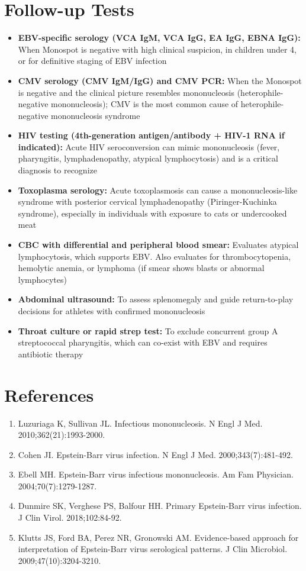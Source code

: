 \section*{Follow-up Tests}
\begin{itemize}
  \item \textbf{EBV-specific serology (VCA IgM, VCA IgG, EA IgG, EBNA IgG):} When Monospot is negative with high clinical suspicion, in children under 4, or for definitive staging of EBV infection
  \item \textbf{CMV serology (CMV IgM/IgG) and CMV PCR:} When the Monospot is negative and the clinical picture resembles mononucleosis (heterophile-negative mononucleosis); CMV is the most common cause of heterophile-negative mononucleosis syndrome
  \item \textbf{HIV testing (4th-generation antigen/antibody + HIV-1 RNA if indicated):} Acute HIV seroconversion can mimic mononucleosis (fever, pharyngitis, lymphadenopathy, atypical lymphocytosis) and is a critical diagnosis to recognize
  \item \textbf{Toxoplasma serology:} Acute toxoplasmosis can cause a mononucleosis-like syndrome with posterior cervical lymphadenopathy (Piringer-Kuchinka syndrome), especially in individuals with exposure to cats or undercooked meat
  \item \textbf{CBC with differential and peripheral blood smear:} Evaluates atypical lymphocytosis, which supports EBV. Also evaluates for thrombocytopenia, hemolytic anemia, or lymphoma (if smear shows blasts or abnormal lymphocytes)
  \item \textbf{Abdominal ultrasound:} To assess splenomegaly and guide return-to-play decisions for athletes with confirmed mononucleosis
  \item \textbf{Throat culture or rapid strep test:} To exclude concurrent group A streptococcal pharyngitis, which can co-exist with EBV and requires antibiotic therapy
\end{itemize}

\section*{References}
\begin{enumerate}
  \item Luzuriaga K, Sullivan JL. Infectious mononucleosis. N Engl J Med. 2010;362(21):1993-2000.
  \item Cohen JI. Epstein-Barr virus infection. N Engl J Med. 2000;343(7):481-492.
  \item Ebell MH. Epstein-Barr virus infectious mononucleosis. Am Fam Physician. 2004;70(7):1279-1287.
  \item Dunmire SK, Verghese PS, Balfour HH. Primary Epstein-Barr virus infection. J Clin Virol. 2018;102:84-92.
  \item Klutts JS, Ford BA, Perez NR, Gronowski AM. Evidence-based approach for interpretation of Epstein-Barr virus serological patterns. J Clin Microbiol. 2009;47(10):3204-3210.
\end{enumerate}

\clearpage
